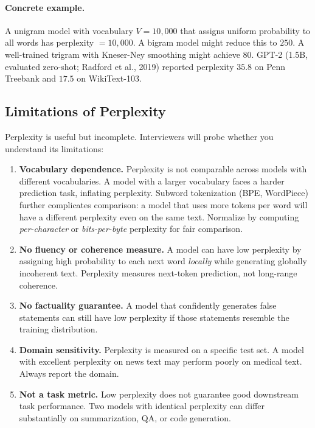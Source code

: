 \paragraph{Concrete example.}
A unigram model with vocabulary $V = 10{,}000$ that assigns uniform
probability to all words has perplexity $= 10{,}000$.  A bigram model might
reduce this to $250$.  A well-trained trigram with Kneser-Ney smoothing might
achieve $80$.  GPT-2 (1.5B, evaluated zero-shot; Radford et al., 2019)
reported perplexity $35.8$ on Penn Treebank and $17.5$ on WikiText-103.

\subsection{Limitations of Perplexity}

Perplexity is useful but incomplete.  Interviewers will probe whether you
understand its limitations:

\begin{enumerate}
    \item \textbf{Vocabulary dependence.}  Perplexity is not comparable across
    models with different vocabularies.  A model with a larger vocabulary faces
    a harder prediction task, inflating perplexity.  Subword tokenization
    (BPE, WordPiece) further complicates comparison: a model that uses more
    tokens per word will have a different perplexity even on the same text.
    Normalize by computing \emph{per-character} or \emph{bits-per-byte}
    perplexity for fair comparison.

    \item \textbf{No fluency or coherence measure.}  A model can have low
    perplexity by assigning high probability to each next word \emph{locally}
    while generating globally incoherent text.  Perplexity measures
    next-token prediction, not long-range coherence.

    \item \textbf{No factuality guarantee.}  A model that confidently generates
    false statements can still have low perplexity if those statements
    resemble the training distribution.

    \item \textbf{Domain sensitivity.}  Perplexity is measured on a specific
    test set.  A model with excellent perplexity on news text may perform
    poorly on medical text.  Always report the domain.

    \item \textbf{Not a task metric.}  Low perplexity does not guarantee good
    downstream task performance.  Two models with identical perplexity can
    differ substantially on summarization, QA, or code generation.
\end{enumerate}

